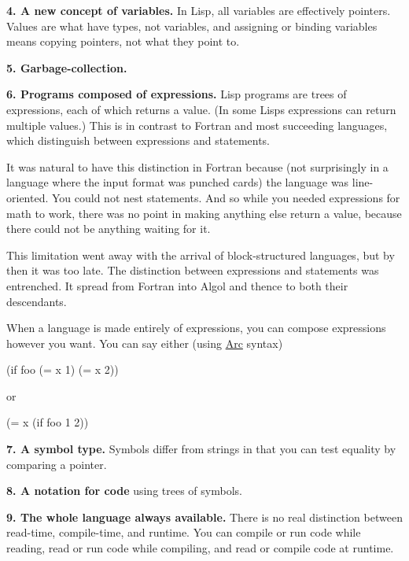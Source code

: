 \textbf{4. A new concept of variables.} In
                  Lisp, all variables are effectively pointers. Values are what
                  have types, not variables, and assigning or binding variables
                  means copying pointers, not what they point to.

\textbf{5. Garbage-collection.}

\textbf{6. Programs composed of expressions.} Lisp
                  programs are trees of expressions, each of which returns a
                  value. (In some Lisps expressions can return multiple values.)
                  This is in contrast to Fortran and most succeeding languages,
                  which distinguish between expressions and statements.

It
                  was natural to have this distinction in Fortran because (not
                  surprisingly in a language where the input format was punched
                  cards) the language was line-oriented. You could not nest
                  statements. And so while you needed expressions for math to
                  work, there was no point in making anything else return a
                  value, because there could not be anything waiting for it.

This
                  limitation went away with the arrival of block-structured
                  languages, but by then it was too late. The distinction
                  between expressions and statements was entrenched. It spread
                  from Fortran into Algol and thence to both their
                  descendants.

When a language is made entirely of
                  expressions, you can compose expressions however you want. You
                  can say either (using
                  \href{http://www.paulgraham.com/arc.html}{Arc} syntax)

(if foo (= x 1)
                  (= x 2))

or

(= x (if foo 1 2))

\textbf{7. A symbol type.}
                  Symbols differ from strings in that you can test equality by
                  comparing a pointer.

\textbf{8. A notation for code}
                  using trees of symbols.

\textbf{9. The whole language always available.}
                  There is no real distinction between read-time, compile-time,
                  and runtime. You can compile or run code while reading, read
                  or run code while compiling, and read or compile code at
                  runtime.

